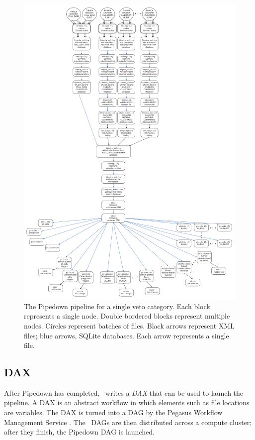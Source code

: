 \begin{figure}[p]
\begin{center}
\includegraphics[width=6in]{figures/PipedownDiagram.pdf}
\end{center}
\caption{
The Pipedown pipeline for a single veto category. Each block represents a
single node. Double bordered blocks represent multiple nodes. Circles represent
batches of files. Black arrows represent XML files; blue arrows, SQLite
databases. Each arrow represents a single file.
}
\label{fig:PipedownDiagram}
\end{figure}

\subsection{DAX}
\label{sec:DAX}

After Pipedown has completed, \ihope~writes a \emph{DAX} that can be used to
launch the pipeline. A DAX is an abstract workflow in which elements such as
file locations are variables. The DAX is turned into a \ac{DAG} by the Pegasus
Workflow Management Service \cite{dax:Pegasus}. The \hipe~\acp{DAG} are then
distributed across a compute cluster; after they finish, the Pipedown \ac{DAG}
is launched.

